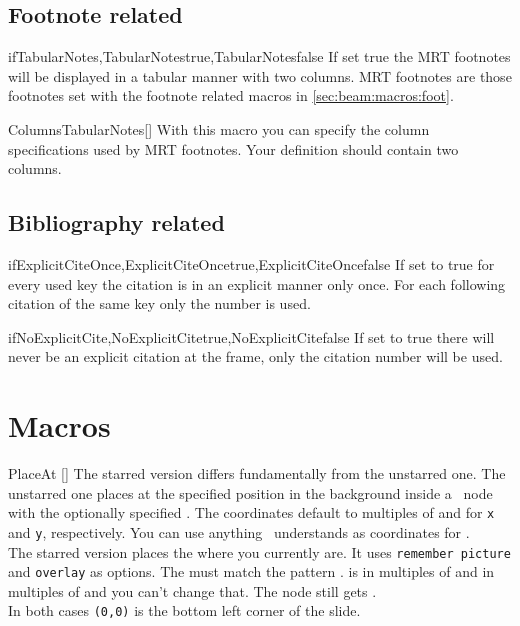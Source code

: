 \subsection{Footnote related}
\begin{describemacro}{ifTabularNotes,TabularNotestrue,TabularNotesfalse}
  If set true the MRT footnotes will be displayed in a tabular manner with two
  columns. MRT footnotes are those footnotes set with the footnote related
  macros in \autoref{sec:beam:macros:foot}.
\end{describemacro}

\begin{describemacro}{ColumnsTabularNotes}[]
  With this macro you can specify the column specifications used by MRT
  footnotes. Your definition should contain two columns.
\end{describemacro}

\subsection{Bibliography related}
\begin{describemacro}
  {ifExplicitCiteOnce,ExplicitCiteOncetrue,ExplicitCiteOncefalse}%
  If set to true for every used key the citation is in an explicit manner only
  once. For each following citation of the same key only the number is used.
\end{describemacro}

\begin{describemacro}{ifNoExplicitCite,NoExplicitCitetrue,NoExplicitCitefalse}
  If set to true there will never be an explicit citation at the frame, only the
  citation number will be used.
\end{describemacro}

\section{Macros}\label{sec:beam:macros}
\begin{describemacro}{PlaceAt}%
  [\meta{*}]
  The starred version differs fundamentally from the unstarred one. The
  unstarred one places  at the specified position  in
  the background inside a \TikZ\ node with the optionally specified . The coordinates default to multiples of  and
   for \texttt{x} and \texttt{y}, respectively. You can use
  anything \TikZ\ understands as coordinates for .\\[\parskip]
  The starred version places the  where you currently are. It
  uses \texttt{remember picture} and \texttt{overlay} as options. The 
  must match the pattern .  is in multiples of 
  and  in multiples of  and you can't change that. The
  node still gets .\\[\parskip]
  In both cases \texttt{(0,0)} is the bottom left corner of the slide.
\end{describemacro}

